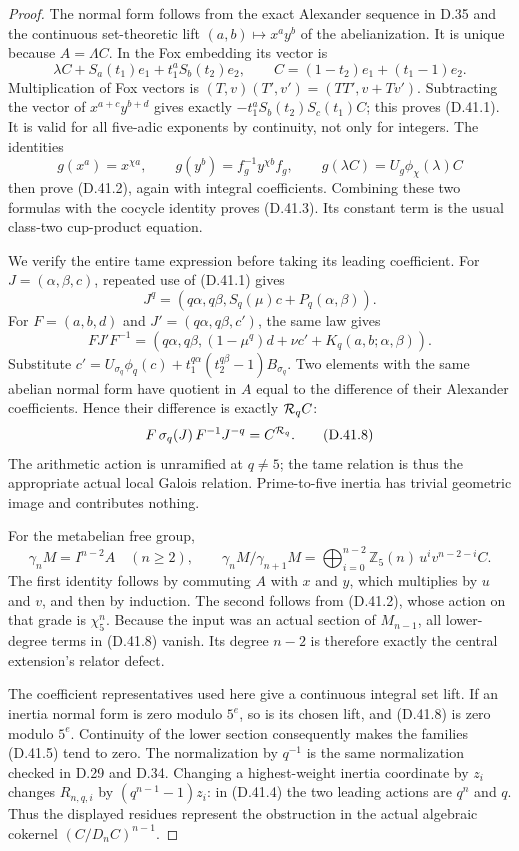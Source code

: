 \begin{proof}
The normal form follows from the exact Alexander
sequence in D.35 and the continuous set-theoretic
lift \((a,b)\mapsto x^ay^b\) of the abelianization.
It is unique because \(A=\Lambda C\).
In the Fox embedding its vector is
\[
 \lambda C+S_a(t_1)e_1+t_1^aS_b(t_2)e_2,\qquad
 C=(1-t_2)e_1+(t_1-1)e_2.
\]
Multiplication of Fox vectors is
\((T,v)(T',v')=(TT',v+Tv')\).
Subtracting the vector of \(x^{a+c}y^{b+d}\) gives
exactly \(-t_1^aS_b(t_2)S_c(t_1)C\); this proves
(D.41.1). It is valid for all five-adic exponents
by continuity, not only for integers.
The identities
\[
 g(x^a)=x^{\chi a},\qquad
 g(y^b)=f_g^{-1}y^{\chi b}f_g,\qquad
 g(\lambda C)=U_g\phi_\chi(\lambda)C
\]
then prove (D.41.2), again with integral coefficients.
Combining these two formulas with the cocycle identity
proves (D.41.3). Its constant term is the usual
class-two cup-product equation.

We verify the entire tame expression before taking
its leading coefficient. For \(J=(\alpha,\beta,c)\),
repeated use of (D.41.1) gives
\[
 J^q=(q\alpha,q\beta,S_q(\mu)c+P_q(\alpha,\beta)).
\]
For \(F=(a,b,d)\) and \(J'=(q\alpha,q\beta,c')\),
the same law gives
\[
 FJ'F^{-1}=
 (q\alpha,q\beta,(1-\mu^q)d+\nu c'
                         +K_q(a,b;\alpha,\beta)).
\]
Substitute
\(c'=U_{\sigma_q}\phi_q(c)
             +t_1^{q\alpha}(t_2^{q\beta}-1)B_{\sigma_q}\).
Two elements with the same abelian normal form have
quotient in \(A\) equal to the difference of their
Alexander coefficients. Hence their difference is
exactly \({\cal R}_q C\):
\[
 F\,\sigma_q(J)\,F^{-1}J^{-q}
                                  =C^{{\cal R}_q}.      \tag{D.41.8}
\]
The arithmetic action is unramified at \(q\ne5\);
the tame relation is thus the appropriate actual
local Galois relation. Prime-to-five inertia has
trivial geometric image and contributes nothing.

For the metabelian free group,
\[
 \gamma_{n}M=I^{n-2}A\quad(n\ge2),\qquad
 \gamma_nM/\gamma_{n+1}M
       =\bigoplus_{i=0}^{n-2}
                \mathbb Z_5(n)\,u^iv^{n-2-i}C.          \tag{D.41.9}
\]
The first identity follows by commuting \(A\)
with \(x\) and \(y\), which multiplies by \(u\)
and \(v\), and then by induction. The second
follows from (D.41.2), whose action on that grade
is \(\chi_5^n\).
Because the input was an actual section of
\(M_{n-1}\), all lower-degree terms in
(D.41.8) vanish. Its degree \(n-2\) is therefore
exactly the central extension's relator defect.

The coefficient representatives used here give a
continuous integral set lift. If an inertia normal
form is zero modulo \(5^e\), so is its chosen
lift, and (D.41.8) is zero modulo \(5^e\).
Continuity of the lower section consequently
makes the families (D.41.5) tend to zero.
The normalization by \(q^{-1}\) is the same
normalization checked in D.29 and D.34.
Changing a highest-weight inertia coordinate by
\(z_i\) changes \(R_{n,q,i}\) by
\((q^{n-1}-1)z_i\): in (D.41.4) the two
leading actions are \(q^n\) and \(q\).
Thus the displayed residues represent the
obstruction in the actual algebraic cokernel
\((C/D_nC)^{n-1}\).


\end{proof}
